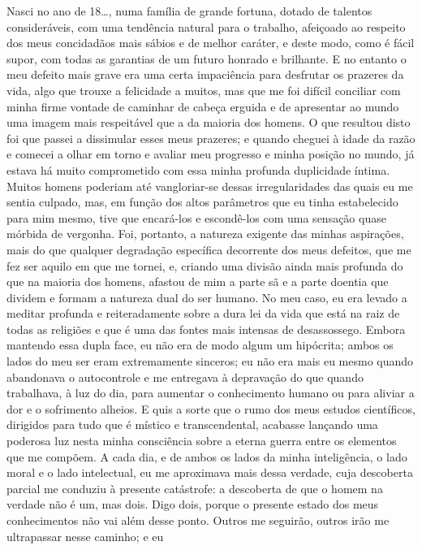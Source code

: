 Nasci no ano de 18\ldots{}, numa família de grande fortuna, dotado de
talentos consideráveis, com uma tendência natural para o trabalho,
afeiçoado ao respeito dos meus concidadãos mais sábios e de melhor
caráter, e deste modo, como é fácil supor, com todas as garantias de um
futuro honrado e brilhante.  E no entanto o meu defeito mais grave era
uma certa impaciência para desfrutar os prazeres da vida, algo que
trouxe a felicidade a muitos, mas que me foi difícil conciliar com
minha firme vontade de caminhar de cabeça erguida e de apresentar ao
mundo uma imagem mais respeitável que a da maioria dos homens.  O que
resultou disto foi que passei a dissimular esses meus prazeres; e
quando cheguei à idade da razão e comecei a olhar em torno e avaliar
meu progresso e minha posição no mundo, já estava há muito comprometido
com essa minha profunda duplicidade íntima.  Muitos homens poderiam até
vangloriar-se dessas irregularidades das quais eu me sentia culpado,
mas, em função dos altos parâmetros que eu tinha estabelecido para mim
mesmo, tive que encará-los e escondê-los com uma sensação quase mórbida
de vergonha.  Foi, portanto, a natureza exigente das minhas aspirações,
mais do que qualquer degradação específica decorrente dos meus
defeitos, que me fez ser aquilo em que me tornei, e, criando uma
divisão ainda mais profunda do que na maioria dos homens, afastou de
mim a parte sã e a parte doentia que dividem e formam a natureza dual
do ser humano.  No meu caso, eu era levado a meditar profunda e
reiteradamente sobre a dura lei da vida que está na raiz de todas as
religiões e que é uma das fontes mais intensas de desassossego.  Embora
mantendo essa dupla face, eu não era de modo algum um hipócrita; ambos
os lados do meu ser eram extremamente sinceros; eu não era mais eu
mesmo quando abandonava o autocontrole e me entregava à depravação do
que quando trabalhava, à luz do dia, para aumentar o conhecimento
humano ou para aliviar a dor e o sofrimento alheios.  E quis a sorte
que o rumo dos meus estudos científicos, dirigidos para tudo que  é
místico e transcendental, acabasse lançando uma poderosa luz nesta
minha consciência sobre a eterna guerra entre os elementos que me
compõem.  A cada dia, e de ambos os lados da minha inteligência, o lado
moral e o lado intelectual, eu me aproximava mais dessa verdade, cuja
descoberta parcial me conduziu à presente catástrofe: a descoberta de
que o homem na verdade não é um, mas dois.  Digo dois, porque o
presente estado  dos meus conhecimentos não vai além desse ponto. 
Outros me seguirão, outros irão me ultrapassar nesse caminho; e eu

